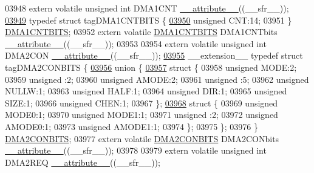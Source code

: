 \begin{DoxyCode}
03948 \textcolor{keyword}{extern} \textcolor{keyword}{volatile} \textcolor{keywordtype}{unsigned} \textcolor{keywordtype}{int}  DMA1CNT \hyperlink{a00015_a493c46f03454991ccc5aa7a6e1dfb2a7}{\_\_attribute\_\_}((\_\_sfr\_\_));
\hypertarget{a00015_source_l03949}{}\hyperlink{a00014}{03949} \textcolor{keyword}{typedef} \textcolor{keyword}{struct }tagDMA1CNTBITS \{
\hypertarget{a00015_source_l03950}{}\hyperlink{a00014_a30be39d82c244f19fd98dd74227487f6}{03950}   \textcolor{keywordtype}{unsigned} CNT:14;
03951 \} \hyperlink{a00014_de/de8/a00405}{DMA1CNTBITS};
03952 \textcolor{keyword}{extern} \textcolor{keyword}{volatile} \hyperlink{a00014_de/de8/a00405}{DMA1CNTBITS} DMA1CNTbits \hyperlink{a00015_a493c46f03454991ccc5aa7a6e1dfb2a7}{\_\_attribute\_\_}((\_\_sfr\_\_));
03953 
03954 \textcolor{keyword}{extern} \textcolor{keyword}{volatile} \textcolor{keywordtype}{unsigned} \textcolor{keywordtype}{int}  DMA2CON \hyperlink{a00015_a493c46f03454991ccc5aa7a6e1dfb2a7}{\_\_attribute\_\_}((\_\_sfr\_\_));
\hypertarget{a00015_source_l03955}{}\hyperlink{a00014}{03955} \_\_extension\_\_ \textcolor{keyword}{typedef} \textcolor{keyword}{struct }tagDMA2CONBITS \{
\hypertarget{a00015_source_l03956}{}\hyperlink{a00015}{03956}   \textcolor{keyword}{union }\{
\hypertarget{a00015_source_l03957}{}\hyperlink{a00015}{03957}     \textcolor{keyword}{struct }\{
03958       \textcolor{keywordtype}{unsigned} MODE:2;
03959       \textcolor{keywordtype}{unsigned} :2;
03960       \textcolor{keywordtype}{unsigned} AMODE:2;
03961       \textcolor{keywordtype}{unsigned} :5;
03962       \textcolor{keywordtype}{unsigned} NULLW:1;
03963       \textcolor{keywordtype}{unsigned} HALF:1;
03964       \textcolor{keywordtype}{unsigned} DIR:1;
03965       \textcolor{keywordtype}{unsigned} SIZE:1;
03966       \textcolor{keywordtype}{unsigned} CHEN:1;
03967     \};
\hypertarget{a00015_source_l03968}{}\hyperlink{a00015}{03968}     \textcolor{keyword}{struct }\{
03969       \textcolor{keywordtype}{unsigned} MODE0:1;
03970       \textcolor{keywordtype}{unsigned} MODE1:1;
03971       \textcolor{keywordtype}{unsigned} :2;
03972       \textcolor{keywordtype}{unsigned} AMODE0:1;
03973       \textcolor{keywordtype}{unsigned} AMODE1:1;
03974     \};
03975   \};
03976 \} \hyperlink{a00014_d0/dd6/a00415}{DMA2CONBITS};
03977 \textcolor{keyword}{extern} \textcolor{keyword}{volatile} \hyperlink{a00014_d0/dd6/a00415}{DMA2CONBITS} DMA2CONbits \hyperlink{a00015_a493c46f03454991ccc5aa7a6e1dfb2a7}{\_\_attribute\_\_}((\_\_sfr\_\_));
03978 
03979 \textcolor{keyword}{extern} \textcolor{keyword}{volatile} \textcolor{keywordtype}{unsigned} \textcolor{keywordtype}{int}  DMA2REQ \hyperlink{a00015_a493c46f03454991ccc5aa7a6e1dfb2a7}{\_\_attribute\_\_}((\_\_sfr\_\_));

\end{DoxyCode}
